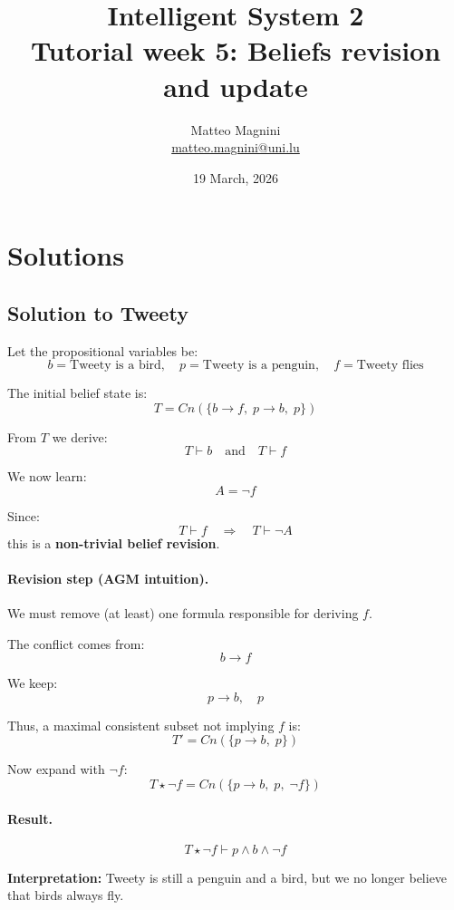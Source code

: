 \documentclass[11pt]{article}
\title{
    Intelligent System 2\\
    Tutorial week 5: Beliefs revision and update
}
\author{
    Matteo Magnini\\
    \href{mailto:matteo.magnini@uni.lu}{matteo.magnini@uni.lu}
}
\date{
    19 March, 2026
}
\begin{document}
    \maketitle

    \section{Solutions}\label{sec:solutions}

    \subsection{Solution to Tweety}

    Let the propositional variables be:
    \[
    b = \text{Tweety is a bird}, \quad
    p = \text{Tweety is a penguin}, \quad
    f = \text{Tweety flies}
    \]

    The initial belief state is:
    \[
    T = Cn(\{b \rightarrow f,\; p \rightarrow b,\; p\})
    \]

    From $T$ we derive:
    \[
    T \vdash b \quad \text{and} \quad T \vdash f
    \]

    We now learn:
    \[
    A = \neg f
    \]

    Since:
    \[
    T \vdash f \quad \Rightarrow \quad T \vdash \neg A
    \]
    this is a \textbf{non-trivial belief revision}.

    \paragraph{Revision step (AGM intuition).}
    We must remove (at least) one formula responsible for deriving $f$.

    The conflict comes from:
    \[
    b \rightarrow f
    \]

    We keep:
    \[
    p \rightarrow b, \quad p
    \]

    Thus, a maximal consistent subset not implying $f$ is:
    \[
    T' = Cn(\{p \rightarrow b,\; p\})
    \]

    Now expand with $\neg f$:
    \[
    T \star \neg f = Cn(\{p \rightarrow b,\; p,\; \neg f\})
    \]

    \paragraph{Result.}
    \[
    T \star \neg f \vdash p \wedge b \wedge \neg f
    \]

    \textbf{Interpretation:}
    Tweety is still a penguin and a bird, but we no longer believe that birds always fly.
\end{document}
